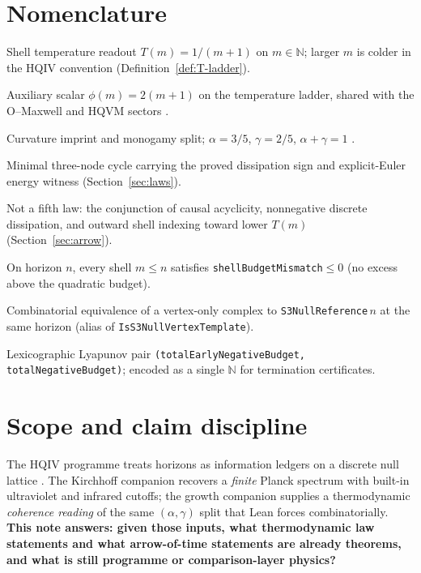 \documentclass[11pt]{amsart}
\begin{document}


\section{Nomenclature}
\label{sec:nomenclature}

\begin{description}[
  font=\normalfont,
  leftmargin=0pt,
  labelwidth=0pt,
  itemsep=0.4\baselineskip,
  parsep=0.1\baselineskip,
  style=nextline
]
  \item[$T(m)$]
  Shell temperature readout $T(m)=1/(m+1)$ on $m\in\mathbb{N}$; larger $m$ is colder in the HQIV convention (Definition~\ref{def:T-ladder}).
  \item[$\phi(m)$]
  Auxiliary scalar $\phi(m)=2(m+1)$ on the temperature ladder, shared with the O--Maxwell and HQVM sectors \cite{hqiv-oct-action-paper}.
  \item[$\alpha$, $\gamma$]
  Curvature imprint and monogamy split; $\alpha=3/5$, $\gamma=2/5$, $\alpha+\gamma=1$ \cite{hqiv-3d-growth-paper,hqiv-oct-action-paper}.
  \item[$C_3$ heat graph]
  Minimal three-node cycle carrying the proved dissipation sign and explicit-Euler energy witness (Section~\ref{sec:laws}).
  \item[Arrow readout]
  Not a fifth law: the conjunction of causal acyclicity, nonnegative discrete dissipation, and outward shell indexing toward lower $T(m)$ (Section~\ref{sec:arrow}).
  \item[\texttt{deficitOnlyOnHorizon}]
  On horizon $n$, every shell $m\le n$ satisfies \texttt{shellBudgetMismatch}$\le 0$ (no excess above the quadratic budget).
  \item[\texttt{IsS3NullReference}]
  Combinatorial equivalence of a vertex-only complex to \texttt{S3NullReference}\,$n$ at the same horizon (alias of \texttt{IsS3NullVertexTemplate}).
  \item[\texttt{shellOpeningLexPair}]
  Lexicographic Lyapunov pair \texttt{(totalEarlyNegativeBudget, totalNegativeBudget)}; encoded as a single $\mathbb{N}$ for termination certificates.
\end{description}

\section{Scope and claim discipline}
\label{sec:scope}

The HQIV programme treats horizons as information ledgers on a discrete null lattice
\cite{ettinger2026hqiv,hqiv-lightcone-paper}.
The Kirchhoff companion \cite{hqiv-kirchhoff-paper} recovers a \emph{finite} Planck spectrum
with built-in ultraviolet and infrared cutoffs; the growth companion
\cite{hqiv-3d-growth-paper} supplies a thermodynamic \emph{coherence reading} of the same
$(\alpha,\gamma)$ split that Lean forces combinatorially.
\textbf{This note answers: given those inputs, what thermodynamic law statements and what
arrow-of-time statements are already theorems, and what is still programme or
comparison-layer physics?}
\end{document}

